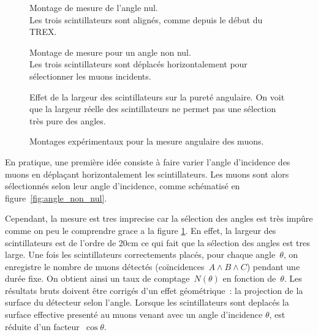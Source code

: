\documentclass[a4paper,12pt,twoside]{article}
\begin{document}
\begin{figure}[H]
  \begin{minipage}{0.3\textwidth}
    \centering
    
    \caption{Montage de mesure de l'angle nul.\\Les trois scintillateurs sont alignés, comme depuis le début du TREX.}
    \label{fig:angle_nul}
  \end{minipage}
  \hfill
  \begin{minipage}
  {0.3\textwidth}
    \centering
    
    \caption{Montage de mesure pour un angle non nul.\\Les trois scintillateurs sont déplacés horizontalement pour sélectionner les muons incidents.}
    \label{fig:angle_non_nul}
  \end{minipage}
  \hfill
  \begin{minipage}{0.3\textwidth}
    \centering
    
    \caption{Effet de la largeur des scintillateurs sur la pureté angulaire. On voit que la largeur réelle des scintillateurs ne permet pas une sélection très pure des angles.}
    \label{fig:range_des_angles}
  \end{minipage}
  \caption{Montages expérimentaux pour la mesure angulaire des muons.}
\end{figure}


\begin{center}
\begin{tcolorbox}[colback=blue!5!white, colframe=blue!60!black, title=Principe de la sélection angulaire par déplacement des scintillateurs]
En pratique, une première idée consiste à faire varier l’angle d’incidence des muons en déplaçant horizontalement les scintillateurs.
 Les muons sont alors sélectionnés selon leur angle d’incidence, comme schématisé en figure~\ref{fig:angle_non_nul}.
 
\end{tcolorbox}
\end{center}
Cependant, la mesure est tres imprecise car la sélection des angles est très impûre comme on peu le comprendre grace a la figure \ref{fig:range_des_angles}.
En effet, la largeur des scintillateurs est de l'ordre de 20cm ce qui fait que la sélection des angles est tres large.
Une fois les scintillateurs correctements placés, pour chaque angle~$\theta$, on enregistre le nombre de muons détectés (coïncidences $A\wedge B\wedge C$) pendant une durée fixe. On obtient ainsi un taux de comptage~$N(\theta)$ en fonction de~$\theta$. Les résultats bruts doivent être corrigés d'un effet géométrique~: la projection de la surface du détecteur selon l'angle. Lorsque les scintillateurs sont deplacés la surface effective presenté au muons venant avec un angle d'incidence $\theta$, est réduite d'un facteur~$\cos\theta$. 
\end{document}
